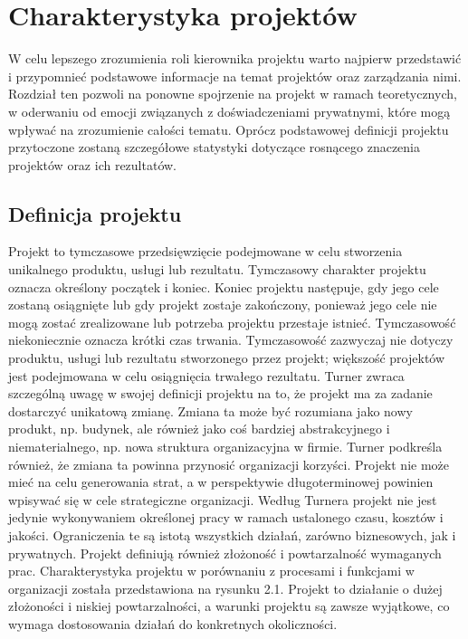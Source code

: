 \newpage %
\section{Charakterystyka projektów}
W celu lepszego zrozumienia roli kierownika projektu warto najpierw przedstawić i przypomnieć podstawowe informacje na temat projektów oraz zarządzania nimi. Rozdział ten pozwoli na ponowne spojrzenie na projekt w ramach teoretycznych, w oderwaniu od emocji związanych z doświadczeniami prywatnymi, które mogą wpływać na zrozumienie całości tematu. Oprócz podstawowej definicji projektu przytoczone zostaną szczegółowe statystyki dotyczące rosnącego znaczenia projektów oraz ich rezultatów.

\subsection{Definicja projektu}
Projekt to tymczasowe przedsięwzięcie podejmowane w celu stworzenia unikalnego produktu, usługi lub rezultatu. Tymczasowy charakter projektu oznacza określony początek i koniec. Koniec projektu następuje, gdy jego cele zostaną osiągnięte lub gdy projekt zostaje zakończony, ponieważ jego cele nie mogą zostać zrealizowane lub potrzeba projektu przestaje istnieć. Tymczasowość niekoniecznie oznacza krótki czas trwania. Tymczasowość zazwyczaj nie dotyczy produktu, usługi lub rezultatu stworzonego przez projekt; większość projektów jest podejmowana w celu osiągnięcia trwałego rezultatu. \autocite{pmbok}
Turner \autocite{Turner2016} zwraca szczególną uwagę w swojej definicji projektu na to, że projekt ma za zadanie dostarczyć unikatową zmianę. Zmiana ta może być rozumiana jako nowy produkt, np. budynek, ale również jako coś bardziej abstrakcyjnego i niematerialnego, np. nowa struktura organizacyjna w firmie. Turner podkreśla również, że zmiana ta powinna przynosić organizacji korzyści. Projekt nie może mieć na celu generowania strat, a w perspektywie długoterminowej powinien wpisywać się w cele strategiczne organizacji.
Według Turnera projekt nie jest jedynie wykonywaniem określonej pracy w ramach ustalonego czasu, kosztów i jakości. Ograniczenia te są istotą wszystkich działań, zarówno biznesowych, jak i prywatnych. Projekt definiują również złożoność i powtarzalność wymaganych prac. Charakterystyka projektu w porównaniu z procesami i funkcjami w organizacji została przedstawiona na rysunku 2.1. Projekt to działanie o dużej złożoności i niskiej powtarzalności, a warunki projektu są zawsze wyjątkowe, co wymaga dostosowania działań do konkretnych okoliczności.
